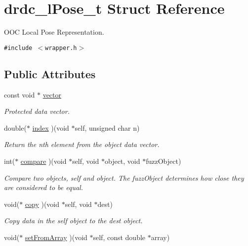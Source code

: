 \hypertarget{structdrdc__lPose__t}{
\section{drdc\_\-lPose\_\-t Struct Reference}
\label{structdrdc__lPose__t}
}
OOC Local Pose Representation.  


{\tt \#include $<$wrapper.h$>$}

\subsection*{Public Attributes}
\begin{CompactItemize}
\item 
const void $\ast$ \hyperlink{structdrdc__lPose__t_a2606cafb79c9c8391a246b5b9f04cd1}{vector}
\begin{CompactList}\small\item\em Protected data vector. \item\end{CompactList}\item 
double($\ast$ \hyperlink{structdrdc__lPose__t_7f347af757e1e7d642878ca00a28a806}{index} )(void $\ast$self, unsigned char n)
\begin{CompactList}\small\item\em Return the nth element from the object data vector. \item\end{CompactList}\item 
int($\ast$ \hyperlink{structdrdc__lPose__t_a06dae4c38f13dd718b88a62a259dde9}{compare} )(void $\ast$self, void $\ast$object, void $\ast$fuzzObject)
\begin{CompactList}\small\item\em Compare two objects, self and object. The fuzzObject determines how close they are considered to be equal. \item\end{CompactList}\item 
void($\ast$ \hyperlink{structdrdc__lPose__t_c9cc04bfd0d80d10a4edcf25686fc4e3}{copy} )(void $\ast$self, void $\ast$dest)
\begin{CompactList}\small\item\em Copy data in the self object to the dest object. \item\end{CompactList}\item 
void($\ast$ \hyperlink{structdrdc__lPose__t_c57df145bf3c3822128fe37bc1e530c6}{setFromArray} )(void $\ast$self, const double $\ast$array)

\end{CompactItemize}
